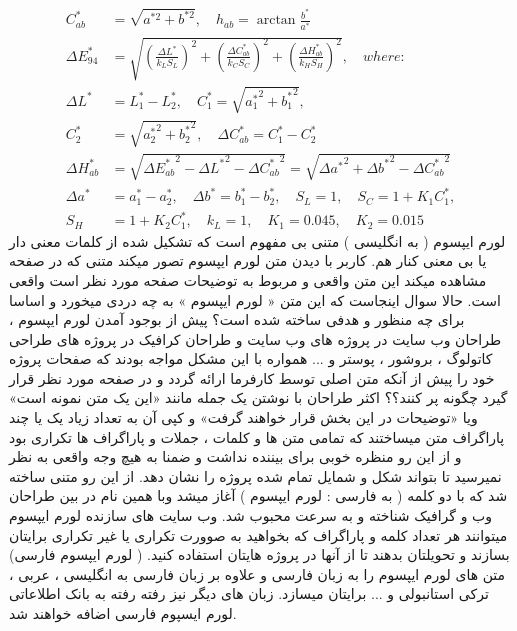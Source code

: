  
 \begin{equation}
 \begin{aligned}
 C_{ab}^* & = \sqrt{a^{*2} + b^{*2}} ,\quad h_{ab} = \arctan \frac{b^{*}}{a^{*}}\\
 \Delta E_{94}^* & = \sqrt{ \left(\frac{\Delta L^*}{k_L S_L}\right)^2 + \left(\frac{\Delta C^*_{ab}}{k_C S_C}\right)^2 + \left(\frac{\Delta H^*_{ab}}{k_H S_H}\right)^2 }, \quad where:\\
 \Delta L^* &= L^*_1 - L^*_2 ,\quad C^*_1 = \sqrt{ {a^*_1}^2 + {b^*_1}^2 } ,\\
 C^*_2 &= \sqrt{ {a^*_2}^2 + {b^*_2}^2 } ,\quad \Delta C^*_{ab} = C^*_1 - C^*_2 \\
 \Delta H^*_{ab} & = \sqrt{ {\Delta E^*_{ab}}^2 - {\Delta L^*}^2 - {\Delta C^*_{ab}}^2 } = \sqrt{ {\Delta a^*}^2 + {\Delta b^*}^2 - {\Delta C^*_{ab}}^2 }\\
 \Delta a^* & = a^*_1 - a^*_2 ,\quad \Delta b^* = b^*_1 - b^*_2, \quad S_L = 1 , \quad S_C = 1+K_1 C^*_1 ,\\
  S_H & = 1+K_2 C^*_1, \quad k_L = 1 , \quad K_1 = 0.045, \quad K_2 = 0.015
  \end{aligned}
 \end{equation}
لورم ایپسوم ( به انگلیسی  ) متنی بی مفهوم است که تشکیل شده از کلمات معنی دار یا بی معنی کنار هم. کاربر با دیدن متن لورم ایپسوم تصور میکند متنی که در صفحه مشاهده میکند این متن واقعی و مربوط به توضیحات صفحه مورد نظر است واقعی است. حالا سوال اینجاست که این متن « لورم ایپسوم » به چه دردی میخورد و اساسا برای چه منظور و هدفی ساخته شده است؟ پیش از بوجود آمدن لورم ایپسوم ، طراحان وب سایت در پروژه های وب سایت و طراحان کرافیک در پروژه های طراحی کاتولوگ ، بروشور ، پوستر و ... همواره با این مشکل مواجه بودند که صفحات پروژه خود را پیش از آنکه متن اصلی توسط کارفرما ارائه گردد و در صفحه مورد نظر قرار گیرد چگونه پر کنند؟؟ اکثر طراحان با نوشتن یک جمله مانند «این یک متن نمونه است» ویا «توضیحات در این بخش قرار خواهند گرفت» و کپی آن به تعداد زیاد یک یا چند پاراگراف متن میساختند که تمامی متن ها و کلمات ، جملات و پاراگراف ها تکراری بود و از این رو منظره خوبی برای بیننده نداشت و ضمنا به هیچ وجه واقعی به نظر نمیرسید تا بتواند شکل و شمایل تمام شده پروژه را نشان دهد. از این رو متنی ساخته شد که با دو کلمه ( به فارسی : لورم ایپسوم ) آغاز میشد وبا همین نام در بین طراحان وب و گرافیک شناخته و به سرعت محبوب شد. وب سایت های سازنده لورم ایپسوم میتوانند هر تعداد کلمه و پاراگراف که بخواهید به صوورت تکراری یا غیر تکراری برایتان بسازند و تحویلتان بدهند تا از آنها در پروژه هایتان استفاده کنید. ( لورم ایپسوم فارسی) متن های لورم ایپسوم را به زبان فارسی و علاوه بر زبان فارسی به انگلیسی ، عربی ، ترکی استانبولی و ... برایتان میسازد. زبان های دیگر نیز رفته رفته به بانک اطلاعاتی لورم ایسپوم فارسی اضافه خواهند شد.  
 
